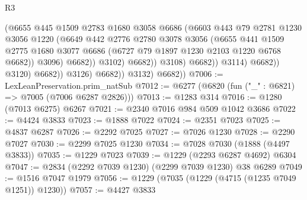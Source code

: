 \begin{lexlean}{R3}
\begin{coremodule}
                                        (@6655
                                          @445
                                          @1509
                                          @2783
                                          @1680
                                          @3058
                                          @6686
                                          (@6603
                                            @443
                                            @79
                                            @2781
                                            @1230
                                            @3056
                                            @1220
                                            (@6649
                                              @442
                                              @2776
                                              @2780
                                              @3078
                                              @3056
                                              (@6655
                                                @441
                                                @1509
                                                @2775
                                                @1680
                                                @3077
                                                @6686
                                                (@6727 @79 @1897 @1230 @2103 @1220 @6768 @6682))
                                              @3096)
                                            @6682))
                                        @3102)
                                      @6682))
                                  @3108)
                                @6682))
                            @3114)
                          @6682))
                      @3120)
                    @6682))
                @3126)
              @6682))
          @3132)
        @6682))
@7006 := LexLeanPreservation.prim_natSub
@7012 := @6277 (@6820 (fun ("_" : @6821) => @7005 (@7006 @6287 @2826)))
@7013 := @1283 @314
@7016 := @1280 (@7013 @6275) @6267
@7021 := @2340 @7016 @984 @509 @1042 @3686
@7022 := @4424 @3833
@7023 := @1888 @7022
@7024 := @2351 @7023
@7025 := @4837 @6287
@7026 := @2292 @7025
@7027 := @7026 @1230
@7028 := @2290 @7027
@7030 := @2299 @7025 @1230
@7034 := @7028 @7030 (@1888 (@4497 @3833))
@7035 := @1229 @7023
@7039 := @1229 (@2293 @6287 @4692) @6304
@7047 := @2834 (@2292 @7039 @1230) (@2299 @7039 @1230) @38 @6289
@7049 := @1516 @7047 @1979
@7056 := @1229 (@7035 (@1229 (@4715 (@1235 @7049 @1251)) @1230))
@7057 := @4427 @3833

\end{coremodule}
\end{lexlean}
